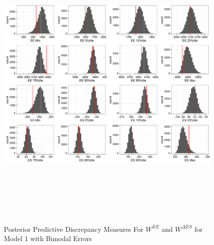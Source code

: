 \documentclass[11pt]{article}\usepackage[]{graphicx}\usepackage[]{color}
\begin{document}
  \begin{figure}
  \centering
  \includegraphics[width=17cm,height=15cm]{manual_figure/wpwdiag1b.pdf}
  \caption{Posterior Predictive Discrepancy Measures For $W^{EE}$ and $W^{\Delta ES}$ for Model 1 with Bimodal Errors}
  \label{wpwdiag1b}
  \end{figure}
\end{document}

